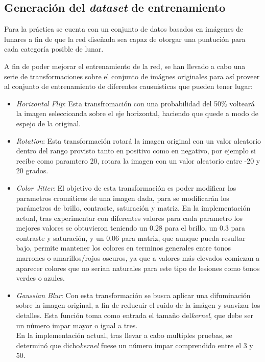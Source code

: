 \subsection{Generación del \textit{dataset} de entrenamiento}

Para la práctica se cuenta con un conjunto de datos basados en imágenes de lunares a fin de que la red diseñada sea capaz de otorgar una puntución para cada categoría posible de lunar.\medskip

A fin de poder mejorar el entrenamiento de la red, se han llevado a cabo una serie de transformaciones sobre el conjunto de imágnes originales para así proveer al conjunto de entrenamiento de diferentes causuisticas que pueden tener lugar:
\begin{itemize}
    \item \textit{Horizontal Flip}: Esta transfromación con una probabilidad del 50\% volteará la imagen seleccioanda sobre el eje horizontal, haciendo que quede a modo de espejo de la original.
    \item \textit{Rotation}: Esta transformación rotará la imagen original con un valor aleatorio dentro del rango provisto tanto en positivo como en negativo, por ejemplo si recibe como paramtero 20, rotara la imagen con un valor aleatorio entre -20 y 20 grados.
    \item \textit{Color Jitter}: El objetivo de esta transformación es poder modificar los parametros cromáticos de una imagen dada, para se modificarán los parámetros de brillo, contraste, saturación y matriz.
    En la implementación actual, tras experimentar con diferentes valores para cada parametro los mejores valores se obtuvieron teniendo un 0.28 para el brillo, un 0.3 para contraste y saturación, y un 0.06 para matriz,
    que aunque pueda resultar bajo, permite mantener los colores en terminos generales entre tonos marrones o amarillos/rojos oscuros, ya que a valores más elevados comiezan a aparecer colores que no serían naturales para este tipo de lesiones como tonos verdes o azules.
    \item \textit{Gaussian Blur}: Con esta transformación se busca aplicar una difuminación sobre la imagen original, a fin de reducuir el ruido de la imágen y suavizar los detalles. Esta función toma como entrada el tamaño del\textit{kernel}, que debe ser un número impar mayor o igual a tres.\\
    En la implementación actual, tras llevar a cabo multiples pruebas, se determinó que dicho\textit{kernel} fuese un número impar comprendido entre el 3 y 50.
\end{itemize}

